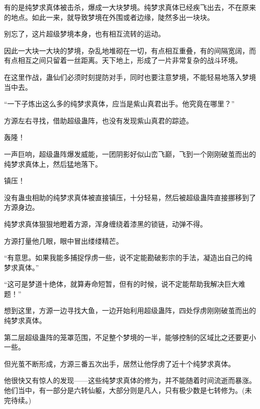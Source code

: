 \begin{this_body}
有的是纯梦求真体被击杀，爆成一大块梦境。纯梦求真体已经疾飞出去，不在原来的地点。如此一来，就导致梦境在外围或者边缘，陡然多出一块块。

别忘了，这片超级梦境本身，也有相互流转的运动。

因此一大块一大块的梦境，杂乱地堆砌在一切，有点相互重叠，有的间隔宽阔，而有点相互之间只留着一丝距离。天下地上，形成了一片非常复杂的战斗环境。

在这里作战，蛊仙们必须时刻提防对手，同时也要注意梦境，不能轻易地落入梦境当中去。

“一下子炼出这么多的纯梦求真体，应当是紫山真君出手。他究竟在哪里？”

方源左右寻找，借助超级蛊阵，也没有发现紫山真君的踪迹。

轰隆！

一声巨响，超级蛊阵爆发威能，一团阴影好似山峦飞巅，飞到一个刚刚破茧而出的纯梦求真体上，然后猛地落下。

镇压！

没有蛊虫相助的纯梦求真体被直接镇压，十分轻易，然后被超级蛊阵直接挪移到了方源身边。

纯梦求真体狠狠地瞪着方源，浑身缠绕着漆黑的锁链，动弹不得。

方源打量他几眼，眼中冒出缕缕精芒。

“有意思。如果我能多捕捉俘虏一些，说不定能勘破影宗的手法，凝造出自己的纯梦求真体。”

“这可是梦道十绝体，就算寿命短暂，但有的时候，说不定能帮助我解决巨大难题！”

想到这里，方源一边寻找大鱼，一边开始利用超级蛊阵，四处俘虏刚刚破茧而出的纯梦求真体。

第二层超级蛊阵的笼罩范围，不足整个梦境的一半，能够控制的区域比之还要更小一些。

但光茧不断形成，方源三番五次出手，居然让他俘虏了近十个纯梦求真体。

他很快又有惊人的发现——这些纯梦求真体的修为，并不能随着时间流逝而暴涨。他们当中，有一部分是六转仙躯，大部分则是凡人，只有极少数是七转修为。(未完待续。)

\end{this_body}


